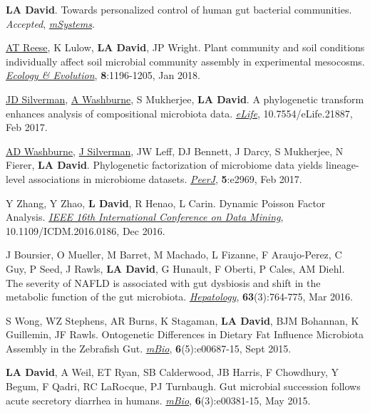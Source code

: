 \documentclass[overlapped,line,11pt]{res}
\begin{document}
\begin{resume}
\begin{revnumerate}[19]

\item {\textbf{LA David}. Towards personalized control of human gut
  bacterial communities. \emph{Accepted}, \emph{\ul{mSystems}}.}

\item {\underline{AT Reese}, K Lulow, \textbf{LA David}, JP
  Wright. Plant community and soil conditions individually affect soil
  microbial community assembly in experimental
  mesocosms. \emph{\ul{Ecology \& Evolution}}, \textbf{8}:1196-1205,
  Jan 2018.}

\item {\underline{JD Silverman}, \underline{A Washburne}, S Mukherjee, \textbf{LA David}. A
  phylogenetic transform enhances analysis of compositional microbiota
  data. \emph{\underline{eLife}}, 10.7554/eLife.21887, Feb 2017.}

\item {\underline{AD Washburne}, \underline{J Silverman}, JW Leff, DJ
  Bennett, J Darcy, S Mukherjee, N Fierer, \textbf{LA
    David}. Phylogenetic factorization of microbiome data yields
  lineage-level associations in microbiome
  datasets. \emph{\underline{PeerJ}}, \textbf{5}:e2969, Feb 2017.}

\item {Y Zhang, Y Zhao, \textbf{L David}, R Henao, L Carin. Dynamic
  Poisson Factor Analysis. \emph{\ul{IEEE 16th International
      Conference on Data Mining}}, 10.1109/ICDM.2016.0186, Dec 2016.}

\item {J Boursier, O Mueller, M Barret, M Machado, L Fizanne, F
  Araujo-Perez, C Guy, P Seed, J Rawls, \textbf{LA David}, G Hunault, F
  Oberti, P Cales, AM Diehl. The severity of NAFLD is associated with
  gut dysbiosis and shift in the metabolic function of the gut
  microbiota. \emph{\underline{Hepatology}}, \textbf{63}(3):764-775, Mar 2016.}

\item {S Wong, WZ Stephens, AR Burns, K Stagaman, \textbf{LA David},
  BJM Bohannan, K Guillemin, JF Rawls.  Ontogenetic Differences in
  Dietary Fat Influence Microbiota Assembly in the Zebrafish Gut.
  \emph{\underline{mBio}}, \textbf{6}(5):e00687-15, Sept 2015.}

\item {\textbf{LA David}, A Weil, ET Ryan, SB Calderwood, JB Harris, F
  Chowdhury, Y Begum, F Qadri, RC LaRocque, PJ Turnbaugh.  Gut
  microbial succession follows acute secretory diarrhea in humans.
 \emph{\underline{mBio}}, \textbf{6}(3):e00381-15, May 2015.}


\end{revnumerate}
\end{resume}
\end{document}
